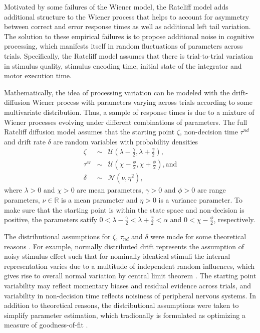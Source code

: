 \documentclass[12pt]{report}
\begin{document}
Motivated by some failures of the Wiener model, the Ratcliff model adds additional structure to the Wiener process that helps to account for asymmetry between correct and error response times as well as additional left tail variation. The solution to these empirical failures is to
propose additional noise in cognitive processing, which
manifests itself in random fluctuations of parameters across
trials. Specifically, the Ratcliff model assumes that there is trial-to-trial variation in stimulus quality, stimulus encoding time, initial state of the integrator and motor execution time. 

Mathematically, the idea of processing variation can be modeled with the drift-diffusion Wiener process with
parameters varying across trials according to some multivariate distribution. Thus, a sample of response times is due to a mixture of Wiener processes evolving under different combinations of parameters. The full Ratcliff diffusion model
assumes that the starting point $\zeta$, non-decision time $\tau^{nd}$ and drift rate $\delta$
are random variables with probability densities
%
\begin{eqnarray}
\zeta & \sim & \mathcal{U}(\lambda - \frac{\gamma}{2}, 
\lambda + \frac{\gamma}{2}), \nonumber \\
\tau^{er} & \sim & \mathcal{U}(\chi - \frac{\phi}{2}, 
\chi + \frac{\phi}{2}), \text{and} \nonumber \\
\delta & \sim & \mathcal{N}(\nu, \eta^2),
\end{eqnarray}
%
where $\lambda > 0$ and $\chi > 0$ are mean parameters, $\gamma > 0$ and $\phi >0$ are range parameters, $\nu \in \mathbb{R}$ is a mean parameter and $\eta > 0$ is a variance parameter. To make sure that the starting point is within the state space and non-decision is positive, the parameters satify $0 < \lambda - \frac{\gamma}{2} < \lambda + \frac{\gamma}{2} < \alpha$ and $0 < \chi - \frac{\phi}{2}$, respectively.

The distributional assumptions for
$\zeta$, $\tau_{nd}$ and $\delta$ were made for some theoretical reasons \citep{Rat1978,RatRou1998,RatTue2002}. For example, normally distributed drift represents the assumption of noisy stimulus effect such that for nominally identical stimuli the internal representation varies due to a multitude of independent random influences, which gives rise to overall normal variation by central limit theorem \citep{Vic1979,CasBer2002}. The starting point variability may reflect momentary biases and residual evidence across trials, and variability in non-decision time reflects noisiness of peripheral nervous systems. 
In addition to theoretical reasons, the distributional assumptions were taken to simplify parameter estimation, which tradionally is formulated as optimizing a measure of goodness-of-fit \citep{Tue2004,VanTue2007,VosVos2007}. 
\end{document}
